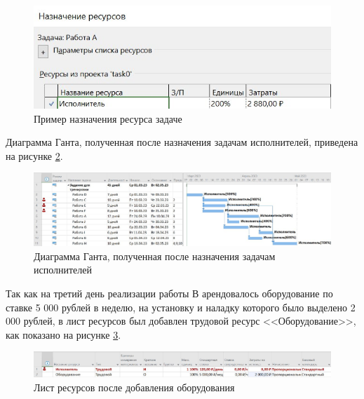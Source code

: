 \begin{figure}[H]
	\begin{center}
		\includegraphics[scale=0.5]{inc/img/task0-assignment.jpg}
	\end{center}
	\captionsetup{justification=centering}
	\caption{Пример назначения ресурса задаче}
	\label{img:task0-assignment}
\end{figure}

Диаграмма Ганта, полученная после назначения задачам исполнителей, приведена на рисунке \ref{img:task0-diagram1}.

\begin{figure}[H]
	\begin{center}
		\includegraphics[scale=0.48]{inc/img/task0-diagram1.jpg}
	\end{center}
	\captionsetup{justification=centering}
	\caption{Диаграмма Ганта, полученная после назначения задачам исполнителей}
	\label{img:task0-diagram1}
\end{figure}

Так как на третий день реализации работы В арендовалось оборудование по ставке 5 000 рублей в неделю, на установку и наладку которого было выделено 2 000 рублей, в лист ресурсов был добавлен трудовой ресурс <<Оборудование>>, как показано на рисунке \ref{img:task0-equipment}.

\begin{figure}[H]
	\begin{center}
		\includegraphics[scale=0.45]{inc/img/task0-equipment.jpg}
	\end{center}
	\captionsetup{justification=centering}
	\caption{Лист ресурсов после добавления оборудования}
	\label{img:task0-equipment}
\end{figure}

